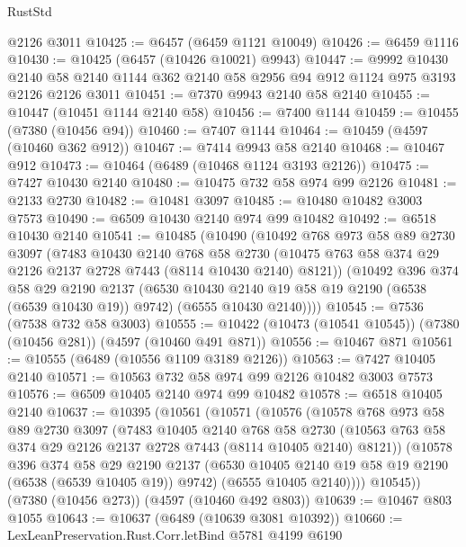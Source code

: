 \begin{lexlean}{RustStd}
\begin{coremodule}
    @2126
    @3011
@10425 := @6457 (@6459 @1121 @10049)
@10426 := @6459 @1116
@10430 := @10425 (@6457 (@10426 @10021) @9943)
@10447 := @9992
    @10430
    @2140
    @58
    @2140
    @1144
    @362
    @2140
    @58
    @2956
    @94
    @912
    @1124
    @975
    @3193
    @2126
    @2126
    @3011
@10451 := @7370 @9943 @2140 @58 @2140
@10455 := @10447 (@10451 @1144 @2140 @58)
@10456 := @7400 @1144
@10459 := @10455 (@7380 (@10456 @94))
@10460 := @7407 @1144
@10464 := @10459 (@4597 (@10460 @362 @912))
@10467 := @7414 @9943 @58 @2140
@10468 := @10467 @912
@10473 := @10464 (@6489 (@10468 @1124 @3193 @2126))
@10475 := @7427 @10430 @2140
@10480 := @10475 @732 @58 @974 @99 @2126
@10481 := @2133 @2730
@10482 := @10481 @3097
@10485 := @10480 @10482 @3003 @7573
@10490 := @6509 @10430 @2140 @974 @99 @10482
@10492 := @6518 @10430 @2140
@10541 := @10485
    (@10490
      (@10492
        @768
        @973
        @58
        @89
        @2730
        @3097
        (@7483
          @10430
          @2140
          @768
          @58
          @2730
          (@10475 @763 @58 @374 @29 @2126 @2137 @2728 @7443 (@8114 @10430 @2140) @8121))
        (@10492
          @396
          @374
          @58
          @29
          @2190
          @2137
          (@6530 @10430 @2140 @19 @58 @19 @2190 (@6538 (@6539 @10430 @19)) @9742)
          (@6555 @10430 @2140))))
@10545 := @7536 (@7538 @732 @58 @3003)
@10555 := @10422 (@10473 (@10541 @10545)) (@7380 (@10456 @281)) (@4597 (@10460 @491 @871))
@10556 := @10467 @871
@10561 := @10555 (@6489 (@10556 @1109 @3189 @2126))
@10563 := @7427 @10405 @2140
@10571 := @10563 @732 @58 @974 @99 @2126 @10482 @3003 @7573
@10576 := @6509 @10405 @2140 @974 @99 @10482
@10578 := @6518 @10405 @2140
@10637 := @10395
    (@10561
      (@10571
        (@10576
          (@10578
            @768
            @973
            @58
            @89
            @2730
            @3097
            (@7483
              @10405
              @2140
              @768
              @58
              @2730
              (@10563 @763 @58 @374 @29 @2126 @2137 @2728 @7443 (@8114 @10405 @2140) @8121))
            (@10578
              @396
              @374
              @58
              @29
              @2190
              @2137
              (@6530 @10405 @2140 @19 @58 @19 @2190 (@6538 (@6539 @10405 @19)) @9742)
              (@6555 @10405 @2140))))
        @10545))
    (@7380 (@10456 @273))
    (@4597 (@10460 @492 @803))
@10639 := @10467 @803 @1055
@10643 := @10637 (@6489 (@10639 @3081 @10392))
@10660 := LexLeanPreservation.Rust.Corr.letBind
    @5781
    @4199
    @6190

\end{coremodule}
\end{lexlean}
